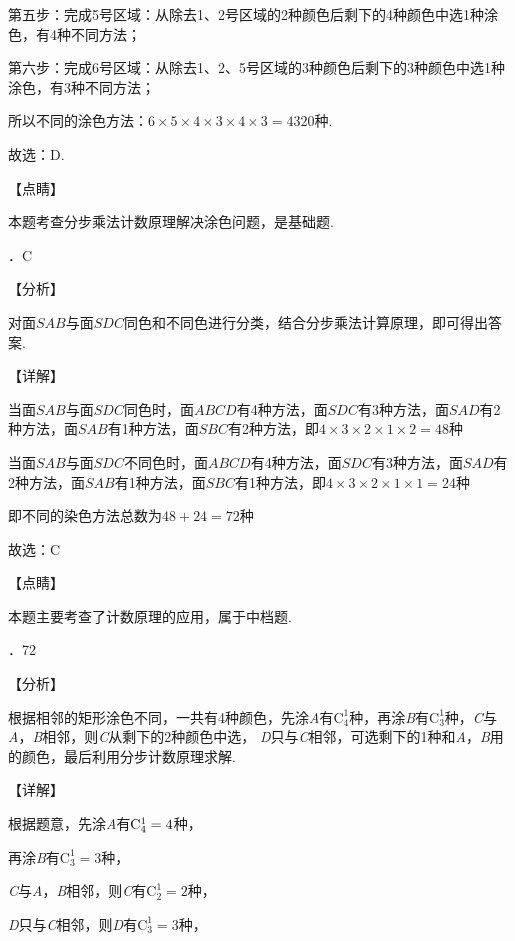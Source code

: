 \noindent 第五步：完成5号区域：从除去1、2号区域的2种颜色后剩下的4种颜色中选1种涂色，有4种不同方法；

\noindent 第六步：完成6号区域：从除去1、2、5号区域的3种颜色后剩下的3种颜色中选1种涂色，有3种不同方法；

\noindent 所以不同的涂色方法：$6\times 5\times 4\times 3\times 4\times 3=4320$种.

\noindent 故选：D.

\noindent 【点睛】

\noindent 本题考查分步乘法计数原理解决涂色问题，是基础题.

．C

\noindent 【分析】

\noindent 对面$SAB$与面$SDC$同色和不同色进行分类，结合分步乘法计算原理，即可得出答案.

\noindent 【详解】

\noindent 当面$SAB$与面$SDC$同色时，面$ABCD$有4种方法，面$SDC$有3种方法，面$SAD$有2种方法，面$SAB$有1种方法，面$SBC$有2种方法，即$4\times 3\times 2\times 1\times 2=48$种

\noindent 当面$SAB$与面$SDC$不同色时，面$ABCD$有4种方法，面$SDC$有3种方法，面$SAD$有2种方法，面$SAB$有1种方法，面$SBC$有1种方法，即$4\times 3\times 2\times 1\times 1=24$种

\noindent 即不同的染色方法总数为$48+24=72$种

\noindent 故选：C

\noindent 【点睛】

\noindent 本题主要考查了计数原理的应用，属于中档题.

．72

\noindent 【分析】

\noindent 根据相邻的矩形涂色不同，一共有4种颜色，先涂\textit{A}有$\mathrm C_{4}^{1} $种，再涂\textit{B}有$\mathrm C_{3}^{1} $种，\textit{C}与\textit{A}，\textit{B}相邻，则\textit{C}从剩下的2种颜色中选，\textit{ D}只与\textit{C}相邻，可选剩下的1种和\textit{A}，\textit{B}用的颜色，最后利用分步计数原理求解.

\noindent 【详解】

\noindent 根据题意，先涂\textit{A}有${\rm C}_{4}^{1} =4$种，

\noindent 再涂\textit{B}有$\mathrm C_{3}^{1} =3$种，

\noindent \textit{C}与\textit{A}，\textit{B}相邻，则\textit{C}有$\mathrm C_{2}^{1} =2$种，

\noindent \textit{D}只与\textit{C}相邻，则\textit{D}有$\mathrm C_{3}^{1} =3$种，

